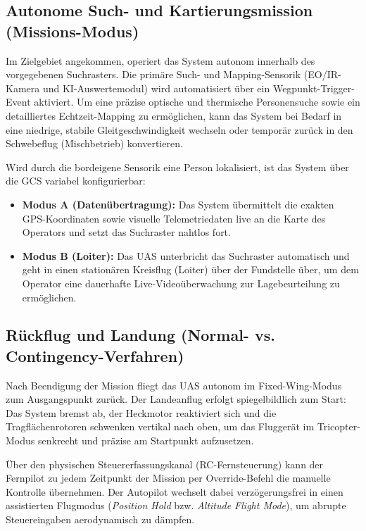 \subsection{Autonome Such- und Kartierungsmission (Missions-Modus)}
Im Zielgebiet angekommen, operiert das System autonom innerhalb des vorgegebenen Suchrasters. 
Die primäre Such- und Mapping-Sensorik (EO/IR-Kamera und KI-Auswertemodul) wird automatisiert über ein Wegpunkt-Trigger-Event aktiviert. 
Um eine präzise optische und thermische Personensuche sowie ein detailliertes Echtzeit-Mapping zu ermöglichen, kann das System bei Bedarf in eine niedrige, 
stabile Gleitgeschwindigkeit wechseln oder temporär zurück in den Schwebeflug (Mischbetrieb) konvertieren.

Wird durch die bordeigene Sensorik eine Person lokalisiert, ist das System über die GCS variabel konfigurierbar:
\begin{itemize}
    \item \textbf{Modus A (Datenübertragung):} Das System übermittelt die exakten GPS-Koordinaten sowie visuelle Telemetriedaten live an die Karte des Operators und setzt das Suchraster nahtlos fort.
    \item \textbf{Modus B (Loiter):} Das UAS unterbricht das Suchraster automatisch und geht in einen stationären Kreisflug (Loiter) über der Fundstelle über, um dem Operator eine dauerhafte Live-Videoüberwachung zur Lagebeurteilung zu ermöglichen.
\end{itemize}

\subsection{Rückflug und Landung (Normal- vs. Contingency-Verfahren)}
Nach Beendigung der Mission fliegt das UAS autonom im Fixed-Wing-Modus zum Ausgangspunkt zurück. 
Der Landeanflug erfolgt spiegelbildlich zum Start: Das System bremst ab, der Heckmotor reaktiviert sich und die Tragflächenrotoren schwenken vertikal nach oben, 
um das Fluggerät im Tricopter-Modus senkrecht und präzise am Startpunkt aufzusetzen.

Über den physischen Steuererfassungskanal (RC-Fernsteuerung) kann der Fernpilot zu jedem Zeitpunkt der Mission per Override-Befehl die manuelle Kontrolle übernehmen. 
Der Autopilot wechselt dabei verzögerungsfrei in einen assistierten Flugmodus (\textit{Position Hold} bzw. \textit{Altitude Flight Mode}), um abrupte Steuereingaben aerodynamisch zu dämpfen.

